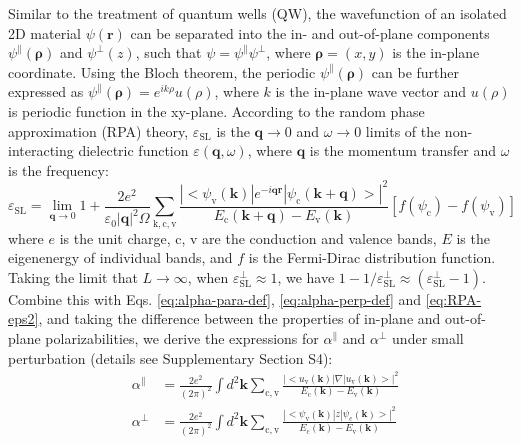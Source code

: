 \documentclass[journal=ancac3,manuscript=article,email=true,hyperref=true,keywords=false]{achemso}
\begin{document}
Similar to the treatment of quantum wells (QW), the wavefunction of an
isolated 2D material $\psi(\mathbf{r})$ can be separated into the in-
and out-of-plane components \cite{davies_physics_1997}
$\psi^{\parallel}(\mathbf{\rho})$ and $\psi^{\perp}(z)$, such that
$\psi=\psi^{\parallel}\psi^{\perp}$, where $\mathbf{\rho}=(x, y)$ is
the in-plane coordinate. Using the Bloch theorem, the periodic
$\psi^{\parallel}(\mathbf{\rho})$ can be further expressed as
$\psi^{\parallel}(\mathbf{\rho})=e^{ik\rho}u(\rho)$, where $k$ is the
in-plane wave vector and $u(\rho)$ is periodic function in the
xy-plane. According to the random phase approximation (RPA)
theory\cite{Adler_1962}, $\varepsilon_{\mathrm{SL}}$ is the
$\mathbf{q} \to 0$ and $\omega \to 0$ limits of the non-interacting
dielectric function $\varepsilon(\mathbf{q}, \omega)$, where
$\mathbf{q}$ is the momentum transfer and $\omega$ is the frequency:
\begin{equation}
  \label{eq:RPA-eps2}
  \varepsilon_{\mathrm{SL}}
  = \lim_{\mathbf{q} \to 0} 1 + \frac{2e^{2}}{\varepsilon_{0} |\mathbf{q}|^{2} \Omega}
  \sum_{\mathrm{k, c, v}}
  \frac{|<\psi_{\mathrm{v}}(\mathbf{k})|e^{-i\mathbf{q}\mathbf{r}}|\psi_{\mathrm{c}}(\mathbf{k+q})>|^{2}}
  {E_{\mathrm{c}}(\mathbf{k+q}) - E_{\mathrm{v}}(\mathbf{k})}
  \left[f(\psi_{\mathrm{c}}) - f(\psi_{\mathrm{v}})\right]
\end{equation}
where $e$ is the unit charge, c, v are the conduction and valence
bands, $E$ is the eigenenergy of individual bands, and $f$ is the
Fermi-Dirac distribution function. Taking the limit that $L\to\infty$,
when $\varepsilon^{\perp}_{\mathrm{SL}} \approx 1$, we have
$1-1/\varepsilon^{\perp}_{\mathrm{SL}} \approx
(\varepsilon_{\mathrm{SL}}^{\perp} - 1)$. Combine this with
Eqs. \ref{eq:alpha-para-def}, \ref{eq:alpha-perp-def} and
\ref{eq:RPA-eps2}, and taking the difference between the properties of
in-plane and out-of-plane polarizabilities, we derive the expressions
for $\alpha^{\parallel}$ and $\alpha^{\perp}$ under small perturbation
(details see Supplementary Section S4):
\begin{subequations}
  \begin{eqnarray}
  \label{eq:alpha_para_RPA}
  & \alpha^{\parallel} &= \frac{2e^{2}}
  {(2 \pi)^{2}} \int d^{2}\mathbf{k} \sum_{\mathrm{c, v}}
  \frac{|<u_{\mathrm{v}}(\mathbf{k})|\nabla|u_{\mathrm{v}}(\mathbf{k})>|^{2}}
                         {E_{\mathrm{c}}(\mathbf{k}) - E_{\mathrm{v}}(\mathbf{k})} \\
  \label{eq:alpha_perp_RPA}
  & \alpha^{\perp} &= \frac{2e^{2}}{(2 \pi) ^{2}} \int d^{2}\mathbf{k}
  \sum_{\mathrm{c, v}}
  \frac{|<\psi_{\mathrm{v}}(\mathbf{k})|z|\psi_{\mathrm{c}}(\mathbf{k})>|^{2}}
  {E_{\mathrm{c}}(\mathbf{k}) - E_{\mathrm{v}}(\mathbf{k})}
  \end{eqnarray}
\end{subequations}
\end{document}
